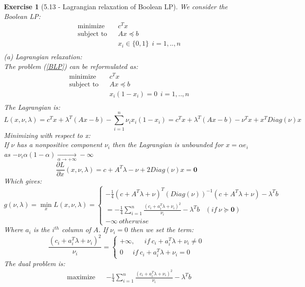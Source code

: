 \documentclass[11pt]{article}
\theoremstyle{exo}
\newtheorem*{exercise}{Exercise}
\newcommand{\1}{\mathbf{1}}
\newcommand{\0}{\mathbf{0}}
\begin{document}
\begin{exercise}[5.13 - Lagrangian relaxation of Boolean LP]
We consider the Boolean LP:
\begin{equation}
\label{BLP}
\begin{aligned}
& {\text{minimize}} & &c^Tx\\
& \text{subject to} & & Ax\preceq b\\
& & &x_i\in\{0,1\}\:\ i=1,..,n\\
\end{aligned}
\end{equation}
(a) \textit{Lagrangian relaxation}:\\
The problem (\ref{BLP}) can be reformulated as:
\begin{equation*}
\begin{aligned}
& {\text{minimize}} & &c^Tx\\
& \text{subject to} & & Ax\preceq b\\
& & &x_i(1-x_i)=0\:\ i=1,..,n\\
\end{aligned}
\end{equation*}
The Lagrangian is:
\[L(x,\nu,\lambda)=c^Tx+\lambda^T(Ax-b)-\sum_{i=1}^n\nu_ix_i(1-x_i)=c^Tx+\lambda^T(Ax-b)-\nu^Tx+x^TDiag(\nu)x\]
Minimizing with respect to x:\\
If $\nu$ has a nonpositive component $\nu_i$ then the Lagrangian is unbounded for $x=\alpha e_i$ as $-\nu_i\alpha(1-\alpha)\xrightarrow[\alpha\to+\infty]{}-\infty$
\[\frac{\partial L}{\partial x}(x,\nu,\lambda)=c+A^T\lambda-\nu+2Diag(\nu)x=\0\]
Which gives:
\[g(\nu,\lambda)=\min_xL(x,\nu,\lambda)=\begin{cases}-\frac{1}{4}(c+A^T\lambda+\nu)^T(Diag(\nu))^{-1}(c+A^T\lambda+\nu)-\lambda^Tb\\
=-\frac{1}{4}\sum_{i=1}^n\frac{(c_i+a_i^T\lambda+\nu_i)^2}{\nu_i}-\lambda^Tb\hspace{10pt}(if\:\nu\succeq\0)\\
-\infty\:otherwise\end{cases}\]
Where $a_i$ is the $i^{th}$ column of $A$. If $\nu_i=0$ then we set the term:
\[\frac{(c_i+a_i^T\lambda+\nu_i)^2}{\nu_i}=\begin{cases}+\infty,\phantom{abc}if\:c_i+a_i^T\lambda+\nu_i\neq0\\
0\phantom{abc}if\:c_i+a_i^T\lambda+\nu_i=0\end{cases}\]
The dual problem is:
\begin{equation*}
\begin{aligned}
& {\text{maximize}} & &-\frac{1}{4}\sum_{i=1}^n\frac{(c_i+a_i^T\lambda+\nu_i)^2}{\nu_i}-\lambda^Tb\\

\end{aligned}
\end{equation*}
\end{exercise}
\end{document}
